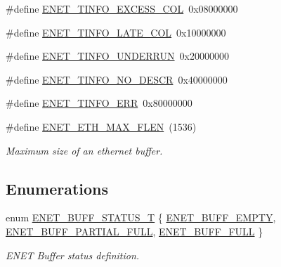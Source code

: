 \begin{DoxyCompactItemize}
$$\item 
\#define \hyperlink{group__ENET__17XX__40XX_ga5c85ac99ceb6444c5beb2afbcafee2ec}{E\-N\-E\-T\-\_\-\-T\-I\-N\-F\-O\-\_\-\-E\-X\-C\-E\-S\-S\-\_\-\-C\-O\-L}~0x08000000
\item 
\#define \hyperlink{group__ENET__17XX__40XX_ga28ff3c0b58337f73dcf19af5c77b1813}{E\-N\-E\-T\-\_\-\-T\-I\-N\-F\-O\-\_\-\-L\-A\-T\-E\-\_\-\-C\-O\-L}~0x10000000
\item 
\#define \hyperlink{group__ENET__17XX__40XX_ga1c695274991bb04562d674a2869bd2c7}{E\-N\-E\-T\-\_\-\-T\-I\-N\-F\-O\-\_\-\-U\-N\-D\-E\-R\-R\-U\-N}~0x20000000
\item 
\#define \hyperlink{group__ENET__17XX__40XX_ga217a2ea7ea34a8ce88c5252d838943ba}{E\-N\-E\-T\-\_\-\-T\-I\-N\-F\-O\-\_\-\-N\-O\-\_\-\-D\-E\-S\-C\-R}~0x40000000
\item 
\#define \hyperlink{group__ENET__17XX__40XX_gaeb11bfbbf43a3c82fb88e56a5e68e7bc}{E\-N\-E\-T\-\_\-\-T\-I\-N\-F\-O\-\_\-\-E\-R\-R}~0x80000000
\item 
\#define \hyperlink{group__ENET__17XX__40XX_gacba3b6d78224fc1ee628088edbff5609}{E\-N\-E\-T\-\_\-\-E\-T\-H\-\_\-\-M\-A\-X\-\_\-\-F\-L\-E\-N}~(1536)
\begin{DoxyCompactList}\small\item\em Maximum size of an ethernet buffer. \end{DoxyCompactList}\end{DoxyCompactItemize}
\subsection*{Enumerations}
\begin{DoxyCompactItemize}
\item 
enum \hyperlink{group__ENET__17XX__40XX_gab29d71439401a8d4f68643acfd10959b}{E\-N\-E\-T\-\_\-\-B\-U\-F\-F\-\_\-\-S\-T\-A\-T\-U\-S\-\_\-\-T} \{ \hyperlink{group__ENET__17XX__40XX_ggab29d71439401a8d4f68643acfd10959ba3f06386ec3b80ad2f5abd3b7e4bd46ce}{E\-N\-E\-T\-\_\-\-B\-U\-F\-F\-\_\-\-E\-M\-P\-T\-Y}, 
\hyperlink{group__ENET__17XX__40XX_ggab29d71439401a8d4f68643acfd10959ba242d1f03fa0a6658fb83e72bb4046c7f}{E\-N\-E\-T\-\_\-\-B\-U\-F\-F\-\_\-\-P\-A\-R\-T\-I\-A\-L\-\_\-\-F\-U\-L\-L}, 
\hyperlink{group__ENET__17XX__40XX_ggab29d71439401a8d4f68643acfd10959bacaa757380b8ad295693f72762f49163e}{E\-N\-E\-T\-\_\-\-B\-U\-F\-F\-\_\-\-F\-U\-L\-L}
 \}
\begin{DoxyCompactList}\small\item\em E\-N\-E\-T Buffer status definition. \end{DoxyCompactList}\end{DoxyCompactItemize}
